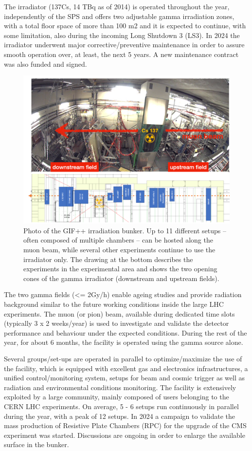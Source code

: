 The irradiator (137Cs, 14 TBq as of 2014) is operated throughout the year, independently of 
the SPS and offers two adjustable gamma irradiation zones, with a total floor space of more than 100 m2 and it is expected to continue, with some limitation, also during the incoming Long Shutdown 3 (LS3). In 2024 the irradiator underwent major corrective/preventive maintenance in order to assure smooth operation over, at least, the next 5 years. A new maintenance contract was also funded and signed. 

\begin{figure}[!h]
    \centering
    \includegraphics[width=0.75\linewidth]{image8.png}
    \caption{Photo of the GIF++ irradiation bunker. Up to 11 different setups – often composed of multiple chambers – can be hosted along the muon beam, while several other experiments continue to use the irradiator only. The drawing at the bottom describes the experiments in the experimental area and shows the two opening cones of the gamma irradiator (downstream and upstream fields). }
    \label{fig:4.3.2}
\end{figure}

The two gamma fields (<= 2Gy/h) enable ageing studies and provide radiation background similar to the future working conditions inside the large LHC experiments. The muon (or pion) beam, available during dedicated time slots (typically 3 x 2 weeks/year) is used to investigate and validate the detector performance and behaviour under the expected conditions. During the rest of the year, for about 6 months, the facility is operated using the gamma source alone.

Several groups/set-ups are operated in parallel to optimize/maximize the use of the facility, which is equipped with excellent gas and electronics infrastructures, a unified control/monitoring system, setups for beam and cosmic trigger as well as radiation and environmental conditions monitoring.
The facility is extensively exploited by a large community, mainly composed of users belonging to the CERN LHC experiments. On average, 5 - 6 setups run continuously in parallel during the year, with a peak of 12 setups. In 2024 a campaign to validate the mass production of Resistive Plate Chambers (RPC) for the upgrade of the CMS experiment was started. Discussions are ongoing in order to enlarge the available surface in the bunker.

